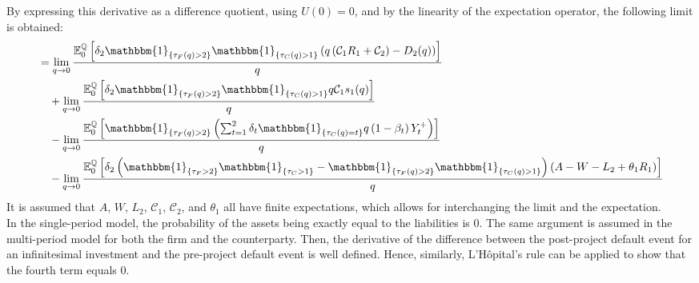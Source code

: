 \documentclass[main.tex]{subfiles}
\begin{document}
        By expressing this derivative as a difference quotient, using $U(0)=0$,
        and by the linearity of the expectation operator,
        the following limit is obtained:
        \begin{align}
            &=
            \lim_{q \rightarrow 0}
            \frac{
                \mathbb{E}_{0}^{\rnmeasure}\left[
                    \delta_{2} \mathbbm{1}_{\{\tau_{F}(q)>2\}} \mathbbm{1}_{\{\tau_{C}(q)>1\}}
                    \left(
                        q\left(\mathcal{C}_{1} R_{1} + \mathcal{C}_{2}\right)
                        - D_{2}(q)
                    \right)
                \right]
            }{
                q
            }
            \nonumber
            \\
            &\quad+
            \lim_{q \rightarrow 0}
            \frac{
                \mathbb{E}_{0}^{\rnmeasure}\left[
                    \delta_2 \mathbbm{1}_{\{\tau_{F}(q)>2\}} \mathbbm{1}_{\{\tau_{C}(q)>1\}}
                    q\mathcal{C}_{1} s_1(q)
                \right]
            }{
                q
            }
            \nonumber
            \\
            &\quad-
            \lim_{q \rightarrow 0}
            \frac{
                \mathbb{E}_{0}^{\rnmeasure}\left[
                    \mathbbm{1}_{\{\tau_{F}(q)>2\}}
                    \left(
                        \sum_{t=1}^{2} \delta_{t} \mathbbm{1}_{\{\tau_{C}(q)=t\}}q\left(1-\beta_t\right)Y_{t}^{+}
                    \right)
                \right]
            }{
                q
            }
            \nonumber
            \\
            &\quad-
            \lim_{q \rightarrow 0}
            \frac{
                \mathbb{E}_{0}^{\rnmeasure}\left[
                    \delta_{2} \left(
                    \mathbbm{1}_{\{\tau_{F}>2\}} \mathbbm{1}_{\{\tau_{C}>1\}} - \mathbbm{1}_{\{\tau_{F}(q)>2\}} \mathbbm{1}_{\{\tau_{C}(q)>1\}}\right)
                    \left(
                        A - W
                        - L_{2}
                        + \theta_{1}R_{1}
                    \right)
                \right]
            }{
                q
            }
            \label{eqn:G-debt-multi-step-1}
        \end{align}
        It is assumed that $A$, $W$, $L_{2}$, $\mathcal{C}_1$, $\mathcal{C}_2$, and $\theta_1$ all have finite expectations,
        which allows for interchanging the limit and the expectation.
        \\
        In the single-period model, the probability of the assets being exactly equal to the liabilities is 0.
        The same argument is assumed in the multi-period model for both the firm and the counterparty.
        Then, the derivative of the difference between 
        the post-project default event for an infinitesimal investment
        and the pre-project default event is well defined.
        Hence, similarly, 
        L'H\^{o}pital's %
        rule can be applied to show that the fourth term equals 0.
        
\end{document}

